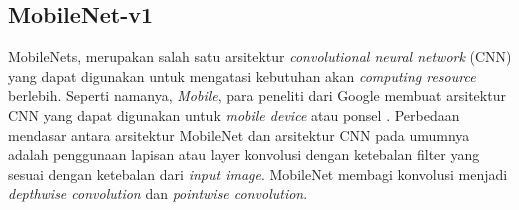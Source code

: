 \subsection{MobileNet-v1}
\label{subsec:mobilenetv1-definition}

MobileNets, merupakan salah satu arsitektur \textit{convolutional neural network} (CNN) yang dapat digunakan untuk mengatasi kebutuhan akan \textit{computing resource} berlebih. Seperti namanya, \textit{Mobile}, para peneliti dari Google membuat arsitektur CNN yang dapat digunakan untuk \textit{mobile device} atau ponsel \citep{mobilnet-def}. Perbedaan mendasar antara arsitektur MobileNet dan arsitektur CNN pada umumnya adalah penggunaan lapisan atau layer konvolusi dengan ketebalan filter yang sesuai dengan ketebalan dari \textit{input image}. MobileNet membagi konvolusi menjadi \textit{depthwise convolution} dan \textit{pointwise convolution}.

